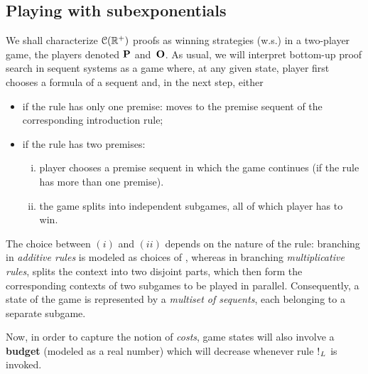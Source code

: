 \subsection{Playing with subexponentials}
We shall  characterize $\mathcal{C}(\mathbb{R}^+)$ proofs as winning strategies (w.s.) in a two-player game, the players denoted $\mathbf{P}$ and~$\mathbf{O}$. As usual, 
we will interpret bottom-up proof search in sequent systems as a game where,  at any given state, player \I first 
chooses a formula of a sequent and, in the next step,  either
\begin{itemize}
\item if the rule has
only one premise: \I moves to the premise sequent of the corresponding introduction rule; 
\item if the rule has two premises: 
\begin{enumerate}[i.]
\item player \II
chooses 
a premise sequent in which the game continues (if the rule has more than one premise).
\item  the game splits into independent subgames, all of
which player \I has to win. 
\end{enumerate}
\end{itemize}

The choice between $(i)$ and $(ii)$ depends on the nature of the rule:
branching
in {\em additive rules} is modeled as choices of \II, whereas in branching {\em multiplicative rules},  \I   splits the context into two disjoint parts,
which then form the corresponding contexts of two  subgames to
be played in parallel. Consequently, a state of the game is represented
by a \textit{multiset of sequents}, each belonging to a separate subgame. 

Now, in order to capture the notion of {\em costs},  game states  will also involve a {\bf budget} (modeled as a real number) which will decrease whenever rule $\hbox{$\mathop{!}^{}$}_L$ is invoked. 

